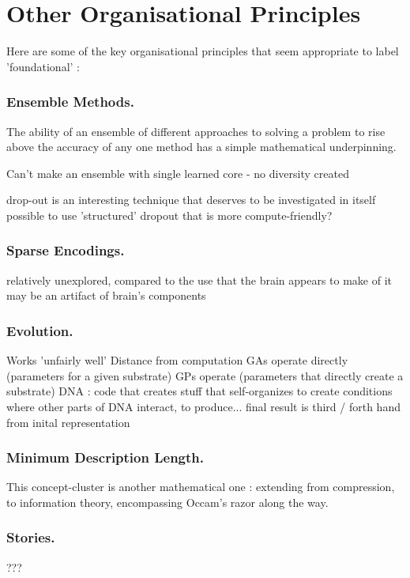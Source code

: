 \documentclass[citeauthoryear]{llncs}
\begin{document}
\section{Other Organisational Principles}

Here are some of the key organisational principles that seem appropriate to label 'foundational' :

\subsubsection*{Ensemble Methods.}
The ability of an ensemble of different approaches to solving a problem to rise above the accuracy 
of any one method has a simple mathematical underpinning.  

Can't make an ensemble with single learned core - no diversity created

drop-out is an interesting technique that deserves to be investigated in itself
  possible to use 'structured' dropout that is more compute-friendly?


\subsubsection*{Sparse Encodings.}
  relatively unexplored, compared to the use that the brain appears to make of it
    may be an artifact of brain's components
    
\subsubsection*{Evolution.}
  Works 'unfairly well'
  Distance from computation
    GAs operate directly (parameters for a given substrate)
    GPs operate (parameters that directly create a substrate)
    DNA : code that creates stuff that self-organizes to create conditions where 
      other parts of DNA interact, to produce...   
        final result is third / forth hand from inital representation

\subsubsection*{Minimum Description Length.}
This concept-cluster is another mathematical one : extending from compression, to information theory,
encompassing Occam's razor along the way.

\subsubsection*{Stories.}
  ???
  
\end{document}
